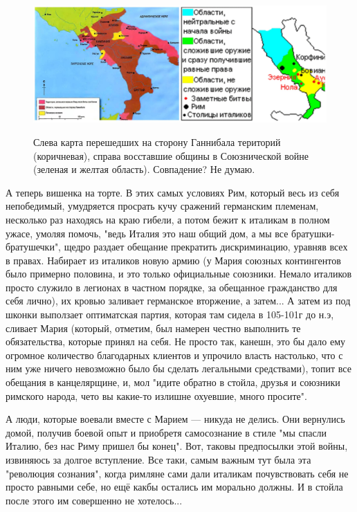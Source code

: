 \begin{figure}[h!tb]
	\centering\includegraphics[scale=0.2]{kimres/1574759302180267294.png}
	\label{fig:kimr6} %
	\caption{Слева карта перешедших на сторону Ганнибала територий (коричневая), справа восставшие общины в Союзнической войне (зеленая и желтая область). Совпадение? Не думаю.}
\end{figure}
А теперь вишенка на торте. В этих самых условиях Рим, который весь из себя непобедимый, умудряется просрать кучу сражений германским племенам, несколько раз находясь на краю гибели, а потом бежит к италикам в полном ужасе, умоляя помочь, "ведь Италия это наш общий дом, а мы все братушки-братушечки", щедро раздает обещание прекратить дискриминацию, уравняв всех в правах. Набирает из италиков новую армию (у Мария союзных контингентов было примерно половина, и это только официальные союзники. Немало италиков просто служило в легионах в частном порядке, за обещанное гражданство для себя лично), их кровью заливает германское вторжение, а затем... А затем из под шконки выползает оптиматская партия, которая там сидела в 105-101г до н.э, сливает Мария (который, отметим, был намерен честно выполнить те обязательства, которые принял на себя. Не просто так, канешн, это бы дало ему огромное количество благодарных клиентов и упрочило власть настолько, что с ним уже ничего невозможно было бы сделать легальными средствами), топит все обещания в канцелярщине, и, мол "идите обратно в стойла, друзья и союзники римского народа, чето вы какие-то излишне охуевшие, много просите".


А люди, которые воевали вместе с Марием — никуда не делись. Они вернулись домой, получив боевой опыт и приобретя самосознание в стиле "мы спасли Италию, без нас Риму пришел бы конец". Вот, таковы предпосылки этой войны, извиняюсь за долгое вступление. Все таки, самым важным тут была эта "революция сознания", когда римляне сами дали италикам почувствовать себя не просто равными себе, но ещё какбы остались им морально должны. И в стойла после этого им совершенно не хотелось...


